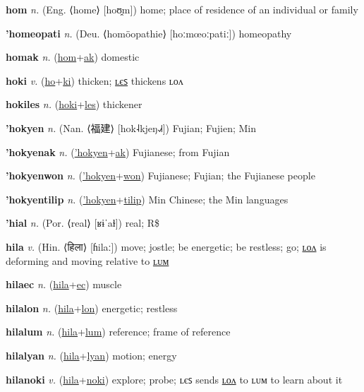 \textbf{\hypertarget{hom}{hom}} \textit{n.} (Eng. ⟨home⟩ [hoʊ̯m])
home; place of residence of an individual or family

\textbf{\hypertarget{'homeopati}{'homeopati}} \textit{n.} (Deu. ⟨homöopathie⟩ [hoːmœoːpatiː])
homeopathy

\textbf{\hypertarget{homak}{homak}} \textit{n.} (\hyperlink{hom}{hom}+\allowbreak \hyperlink{ak}{ak})
domestic

\textbf{\hypertarget{hoki}{hoki}} \textit{v.} (\hyperlink{ho}{ho}+\allowbreak \hyperlink{ki}{ki})
thicken; \hyperlink{hokiles}{ʟєꜱ} thickens ʟᴏᴧ

\textbf{\hypertarget{hokiles}{hokiles}} \textit{n.} (\hyperlink{hoki}{hoki}+\allowbreak \hyperlink{les}{les})
thickener

\textbf{\hypertarget{'hokyen}{'hokyen}} \textit{n.} (Nan. ⟨{\chinese{}福建}⟩ [hok˨kjeŋ˨˩˧])
Fujian; Fujien; Min

\textbf{\hypertarget{'hokyenak}{'hokyenak}} \textit{n.} (\hyperlink{'hokyen}{'hokyen}+\allowbreak \hyperlink{ak}{ak})
Fujianese; from Fujian

\textbf{\hypertarget{'hokyenwon}{'hokyenwon}} \textit{n.} (\hyperlink{'hokyen}{'hokyen}+\allowbreak \hyperlink{won}{won})
Fujianese; Fujian; the Fujianese people

\textbf{\hypertarget{'hokyentilip}{'hokyentilip}} \textit{n.} (\hyperlink{'hokyen}{'hokyen}+\allowbreak \hyperlink{tilip}{tilip})
Min Chinese; the Min languages

\textbf{\hypertarget{'hial}{'hial}} \textit{n.} (Por. ⟨real⟩ [ʁɨˈaɫ])
real; R\$

\textbf{\hypertarget{hila}{hila}} \textit{v.} (Hin. ⟨{\devanagari{}हिला}⟩ [ɦilaː])
move; jostle; be energetic; be restless; go; \hyperlink{hilalon}{ʟᴏᴧ} is deforming and moving relative to \hyperlink{hilalum}{ʟᴜᴍ}

\textbf{\hypertarget{hilaec}{hilaec}} \textit{n.} (\hyperlink{hila}{hila}+\allowbreak \hyperlink{ec}{ec})
muscle

\textbf{\hypertarget{hilalon}{hilalon}} \textit{n.} (\hyperlink{hila}{hila}+\allowbreak \hyperlink{lon}{lon})
energetic; restless

\textbf{\hypertarget{hilalum}{hilalum}} \textit{n.} (\hyperlink{hila}{hila}+\allowbreak \hyperlink{lum}{lum})
reference; frame of reference

\textbf{\hypertarget{hilalyan}{hilalyan}} \textit{n.} (\hyperlink{hila}{hila}+\allowbreak \hyperlink{lyan}{lyan})
motion; energy

\textbf{\hypertarget{hilanoki}{hilanoki}} \textit{v.} (\hyperlink{hila}{hila}+\allowbreak \hyperlink{noki}{noki})
explore; probe; ʟєꜱ sends \hyperlink{hilanokilon}{ʟᴏᴧ} to ʟᴜᴍ to learn about it

